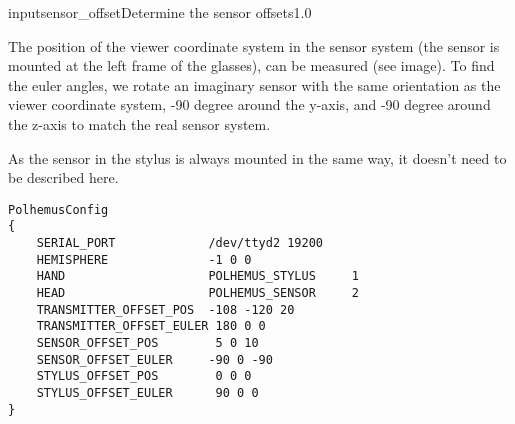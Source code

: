 \begin{covimg}{input}{sensor_offset}{Determine the sensor offsets}{1.0}\end{covimg}

The position of the viewer coordinate system in the 
sensor system (the sensor is mounted at the left frame of the glasses),
can be measured (see image). To find the euler angles, we rotate an 
imaginary sensor with the same orientation as the viewer coordinate system,
-90 degree around the y-axis, and -90 degree
around the z-axis to match the real sensor system.

As the sensor in the stylus is always mounted in the same way, it doesn't 
need to be described here.

\begin{verbatim}
PolhemusConfig
{
    SERIAL_PORT             /dev/ttyd2 19200
    HEMISPHERE              -1 0 0
    HAND                    POLHEMUS_STYLUS     1
    HEAD                    POLHEMUS_SENSOR     2
    TRANSMITTER_OFFSET_POS  -108 -120 20
    TRANSMITTER_OFFSET_EULER 180 0 0
    SENSOR_OFFSET_POS        5 0 10
    SENSOR_OFFSET_EULER     -90 0 -90
    STYLUS_OFFSET_POS        0 0 0
    STYLUS_OFFSET_EULER      90 0 0
}
\end{verbatim} 
